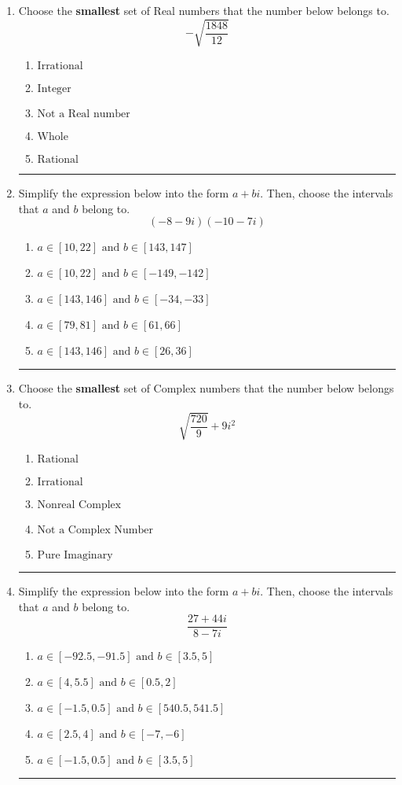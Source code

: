 \documentclass[14pt]{extbook}
\newcommand{\litem}[1]{\item#1\hspace*{-1cm}\rule{\textwidth}{0.4pt}}
\begin{document}
\begin{enumerate}
\litem{
Choose the \textbf{smallest} set of Real numbers that the number below belongs to.\[ -\sqrt{\frac{1848}{12}} \]\begin{enumerate}[label=\Alph*.]
\item \( \text{Irrational} \)
\item \( \text{Integer} \)
\item \( \text{Not a Real number} \)
\item \( \text{Whole} \)
\item \( \text{Rational} \)

\end{enumerate} }
\litem{
Simplify the expression below into the form $a+bi$. Then, choose the intervals that $a$ and $b$ belong to.\[ (-8 - 9 i)(-10 - 7 i) \]\begin{enumerate}[label=\Alph*.]
\item \( a \in [10, 22] \text{ and } b \in [143, 147] \)
\item \( a \in [10, 22] \text{ and } b \in [-149, -142] \)
\item \( a \in [143, 146] \text{ and } b \in [-34, -33] \)
\item \( a \in [79, 81] \text{ and } b \in [61, 66] \)
\item \( a \in [143, 146] \text{ and } b \in [26, 36] \)

\end{enumerate} }
\litem{
Choose the \textbf{smallest} set of Complex numbers that the number below belongs to.\[ \sqrt{\frac{720}{9}}+9i^2 \]\begin{enumerate}[label=\Alph*.]
\item \( \text{Rational} \)
\item \( \text{Irrational} \)
\item \( \text{Nonreal Complex} \)
\item \( \text{Not a Complex Number} \)
\item \( \text{Pure Imaginary} \)

\end{enumerate} }
\litem{
Simplify the expression below into the form $a+bi$. Then, choose the intervals that $a$ and $b$ belong to.\[ \frac{27 + 44 i}{8 - 7 i} \]\begin{enumerate}[label=\Alph*.]
\item \( a \in [-92.5, -91.5] \text{ and } b \in [3.5, 5] \)
\item \( a \in [4, 5.5] \text{ and } b \in [0.5, 2] \)
\item \( a \in [-1.5, 0.5] \text{ and } b \in [540.5, 541.5] \)
\item \( a \in [2.5, 4] \text{ and } b \in [-7, -6] \)
\item \( a \in [-1.5, 0.5] \text{ and } b \in [3.5, 5] \)


\end{enumerate}}
\end{enumerate}
\end{document}
